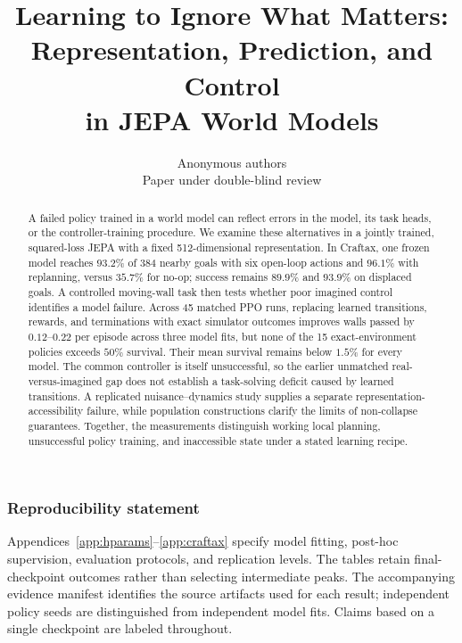 \documentclass{article}
\title{Learning to Ignore What Matters:\\Representation, Prediction, and Control\\in JEPA World Models}
\author{Anonymous authors\\Paper under double-blind review}
\theoremstyle{remark}
\begin{document}
\maketitle
{}
\begin{abstract}
A failed policy trained in a world model can reflect errors in the model, its task heads, or the
controller-training procedure. We examine these alternatives in a jointly trained, squared-loss
JEPA with a fixed 512-dimensional representation. In Craftax, one frozen model reaches $93.2\%$ of
384 nearby goals with six open-loop actions and $96.1\%$ with replanning, versus $35.7\%$ for no-op;
success remains $89.9\%$ and $93.9\%$ on displaced goals. A controlled moving-wall task then tests
whether poor imagined control identifies a model failure. Across 45 matched PPO runs, replacing
learned transitions, rewards, and terminations with exact simulator outcomes improves walls passed
by $0.12$--$0.22$ per episode across three model fits, but none of the 15 exact-environment policies
exceeds $50\%$ survival. Their mean survival remains below $1.5\%$ for every model. The common
controller is itself unsuccessful, so the earlier unmatched real-versus-imagined gap does not
establish a task-solving deficit caused by learned transitions. A replicated nuisance--dynamics study supplies a
separate representation-accessibility failure, while population constructions clarify the limits
of non-collapse guarantees. Together, the measurements distinguish working local planning,
unsuccessful policy training, and inaccessible state under a stated learning recipe.
\end{abstract}







\FloatBarrier





\subsubsection*{Reproducibility statement}
Appendices~\ref{app:hparams}--\ref{app:craftax} specify model fitting, post-hoc supervision,
evaluation protocols, and replication levels. The tables retain final-checkpoint outcomes rather
than selecting intermediate peaks. The accompanying evidence manifest identifies the source
artifacts used for each result; independent policy seeds are distinguished from independent model
fits. Claims based on a single checkpoint are labeled throughout.
\end{document}
